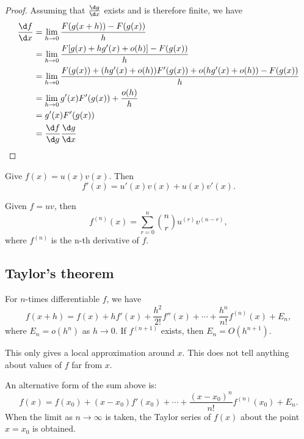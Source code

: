\documentclass[a4paper]{article}
\begin{document}
  \begin{proof}
    Assuming that $\frac{\d g}{\d x}$ exists and is therefore finite, we have
    \begin{align*}
      \frac{\d f}{\d x} &= \lim_{h\to 0}\frac{F(g(x + h)) - F(g(x))}{h}\\
      &= \lim_{h\to 0}\frac{F[g(x) + hg'(x) + o(h)] - F(g(x))}{h}\\
      &= \lim_{h\to 0}\frac{F(g(x)) + (hg'(x) + o(h))F'(g(x)) + o(hg'(x) + o(h)) - F(g(x))}{h}\\
      &= \lim_{h\to 0}g'(x)F'(g(x)) + \frac{o(h)}{h}\\
      &= g'(x)F'(g(x))\\
      &= \frac{\d f}{\d g}\frac{\d g}{\d x}
    \end{align*}
  \end{proof}

  \begin{thm}
    Give $f(x) = u(x)v(x)$. Then 
    \[
      f'(x) = u'(x)v(x) + u(x)v'(x).
    \]
  \end{thm}

  \begin{thm}
    Given $f = uv$, then 
    \[
      f^{(n)}(x) = \sum_{r = 0}^n {n\choose r}u^{(r)}v^{(n - r)},
    \]
    where $f^{(n)}$ is the n-th derivative of $f$.
  \end{thm}

  \subsection{Taylor's theorem}
  \begin{thm}
    For $n$-times differentiable $f$, we have
    \[
      f(x + h) = f(x) + hf'(x) + \frac{h^2}{2!}f''(x) + \cdots + \frac{h^n}{n!}f^{(n)}(x) + E_n,
    \]
    where $E_n = o(h^{n})$ as $h\to 0$. If $f^{(n+1)}$ exists, then $E_n = O(h^{n+1})$.
  \end{thm}
  \note This only gives a local approximation around $x$. This does not tell anything about values of $f$ far from $x$.

  An alternative form of the sum above is:
  \[
    f(x) = f(x_0) + (x-x_0)f'(x_0) + \cdots + \frac{(x-x_0)^n}{n!}f^{(n)}(x_0) + E_n.
  \]
  When the limit as $n\to \infty$ is taken, the Taylor series of $f(x)$ about the point $x = x_0$ is obtained.
\end{document}
